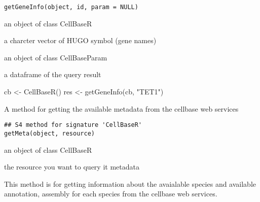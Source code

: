 \documentclass[letterpaper]{book}
\begin{document}
%
\begin{Usage}
\begin{verbatim}
getGeneInfo(object, id, param = NULL)
\end{verbatim}
\end{Usage}
%
\begin{Arguments}
\begin{ldescription}
\item[\code{object}] an object of class CellBaseR

\item[\code{id}] a charcter vector of HUGO symbol (gene names)

\item[\code{param}] an object of class CellBaseParam
\end{ldescription}
\end{Arguments}
%
\begin{Value}
a dataframe of the query result
\end{Value}
%
\begin{Examples}
\begin{ExampleCode}
cb <- CellBaseR()
res <- getGeneInfo(cb, "TET1")
\end{ExampleCode}
\end{Examples}
%
\begin{Description}\relax
A method for getting the available metadata from the cellbase web services
\end{Description}
%
\begin{Usage}
\begin{verbatim}
## S4 method for signature 'CellBaseR'
getMeta(object, resource)
\end{verbatim}
\end{Usage}
%
\begin{Arguments}
\begin{ldescription}
\item[\code{object}] an object of class CellBaseR

\item[\code{resource}] the resource you want to query it metadata
\end{ldescription}
\end{Arguments}
%
\begin{Details}\relax
This method is for getting information about the avaialable species
and available annotation, assembly for each species from the cellbase web 
services.
\end{Details}
\end{document}
